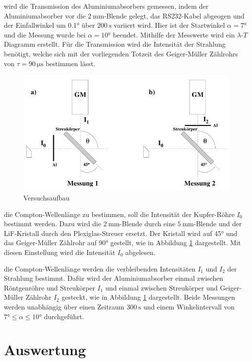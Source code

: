    \justifying wird die Transmission des Aluminiumabsorbers gemessen, indem der Aluminiumabsorber vor die $\SI{2}{\milli\meter}$-Blende gelegt, das RS232-Kabel
    abgeogen und der Einfallwinkel um 0.1° über $\SI{200}{\second}$ variiert wird. Hier ist der Startwinkel $\alpha = 7°$ und die Messung wurde bei $\alpha = 10°$ beendet. 
    Mithilfe der Messwerte wird ein $\lambda$-$T$ Diagramm erstellt. Für die Transmission wird die Intensität der Strahlung benötigt, welche sich mit der vorliegenden
    Totzeit des Geiger-Müller Zählrohrs von $\tau = \SI{90}{\micro\second}$ bestimmen lässt. 

    \begin{figure}
        \centering
        \includegraphics[width=0.75\linewidth]{./images/Aufbau2.jpg}
        \caption{Versuchsaufbau \cite{V603}}
        \label{fig:1b}
    \end{figure}

    \justifying die Compton-Wellenlänge zu bestimmen, soll die Intensität der Kupfer-Röhre $I_0$ bestimmt werden. Dazu wird die $\SI{2}{\milli\meter}$-Blende
    durch eine $\SI{5}{\milli\meter}$-Blende und der LiF-Kristall durch den Plexiglas-Streuer ersetzt. Der Kristall wird auf 45° und das Geiger-Müller Zählrohr auf 90° gestellt, 
    wie in Abbildung \ref{fig:1b} dargestellt. Mit diesen Einstellung wird die Intensität $I_0$ abgelesen.

    \justifying die Compton-Wellenlänge werden die verbleibenden Intensitäten $I_1$ und $I_2$ der Strahlung bestimmt. Dafür wird der Aluminiumabsorber 
    einmal zwischen Röntgenröhre und Streukörper $I_1$ und einmal zwischen Streukörper und Geiger-Müller Zählrohr $I_2$ gesteckt, wie in Abbildung \ref{fig:1b} dargestellt. 
    Beide Messungen werden unabhängig über einen Zeitraum $\SI{300}{\second}$ und einem Winkelintervall von $7° \leq \alpha \leq 10°$ durchgeführt. 


\newpage
\section{Auswertung}

